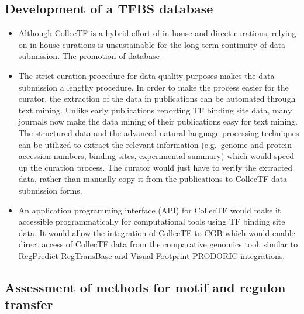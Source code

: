 \subsection{Development of a TFBS database}

\begin{itemize}

\item Although CollecTF is a hybrid effort of in-house and direct curations,
  relying on in-house curations is unsustainable for the long-term continuity
  of data submission. The promotion of database

\item The strict curation procedure for data quality purposes makes the data
  submission a lengthy procedure. In order to make the process easier for the
  curator, the extraction of the data in publications can be automated through
  text mining. Unlike early publications reporting TF binding site data, many
  journals now make the data mining of their publications easy for text
  mining. The structured data and the advanced natural language processing
  techniques can be utilized to extract the relevant information (e.g.\ genome
  and protein accession numbers, binding sites, experimental summary) which
  would speed up the curation process. The curator would just have to verify
  the extracted data, rather than manually copy it from the publications to
  CollecTF data submission forms.

\item An application programming interface (API) for CollecTF would make it
  accessible programmatically for computational tools using TF binding site
  data. It would allow the integration of CollecTF to CGB which would enable
  direct access of CollecTF data from the comparative genomics tool, similar to
  RegPredict-RegTransBase and Visual Footprint-PRODORIC integrations.
\end{itemize}

\subsection{Assessment of methods for motif and regulon transfer}

